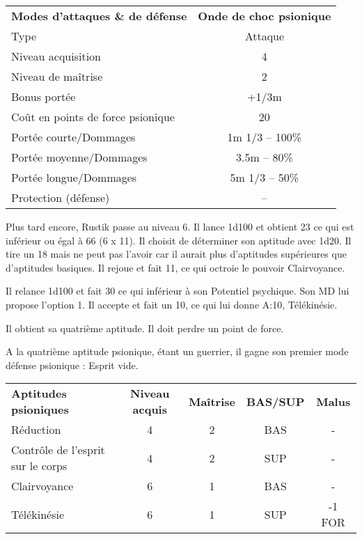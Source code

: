 \bigskip

\begin{tabular}{lc}
\textbf{Modes d'attaques \& de défense} & \textbf{Onde de choc psionique} \\
Type                                & Attaque \\
Niveau acquisition                  & 4 \\
Niveau de maîtrise                  & 2 \\
Bonus portée                        & +1/3m \\
Coût en points de force psionique   & 20 \\
Portée courte/Dommages              &   1m 1/3 -- 100\% \\
Portée moyenne/Dommages             & 3.5m -- 80\% \\
Portée longue/Dommages              &   5m 1/3 -- 50\%  \\
Protection (défense)                & -- \\
\end{tabular}

\bigskip

Plus tard encore, Rustik passe au niveau 6. Il lance 1d100 et obtient 23 ce qui est inférieur ou égal à 66 (6 x 11). Il choisit de déterminer son aptitude avec 1d20. Il tire un 18 mais ne peut pas l'avoir car il aurait plus d'aptitudes supérieures que d'aptitudes basiques. Il rejoue et fait 11, ce qui octroie le pouvoir Clairvoyance.

\bigskip

Il relance 1d100 et fait 30 ce qui inférieur à son Potentiel psychique. Son MD lui propose l'option 1. Il accepte et fait un 10, ce qui lui donne A:10, Télékinésie.

\bigskip

Il obtient sa quatrième aptitude. Il doit perdre un point de force.

\bigskip

A la quatrième aptitude psionique, étant un guerrier, il gagne son premier mode défense psionique : Esprit vide.

\bigskip

\begin{tabular}{lcccc}
\textbf{Aptitudes psioniques} & \textbf{Niveau acquis} & \textbf{Maîtrise}  & \textbf{BAS/SUP} & \textbf{Malus} \\
Réduction                         & 4 & 2 & BAS & - \\
Contrôle de l'esprit sur le corps & 4 & 2 & SUP & - \\
Clairvoyance                      & 6 & 1 & BAS & - \\
Télékinésie                       & 6 & 1 & SUP & -1 FOR\\
\end{tabular}

